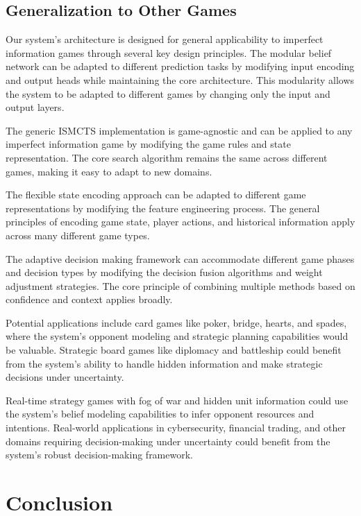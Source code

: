 \documentclass[conference]{IEEEtran}
\begin{document}
\subsection{Generalization to Other Games}

Our system's architecture is designed for general applicability to imperfect information games through several key design principles. The modular belief network can be adapted to different prediction tasks by modifying input encoding and output heads while maintaining the core architecture. This modularity allows the system to be adapted to different games by changing only the input and output layers.

The generic ISMCTS implementation is game-agnostic and can be applied to any imperfect information game by modifying the game rules and state representation. The core search algorithm remains the same across different games, making it easy to adapt to new domains.

The flexible state encoding approach can be adapted to different game representations by modifying the feature engineering process. The general principles of encoding game state, player actions, and historical information apply across many different game types.

The adaptive decision making framework can accommodate different game phases and decision types by modifying the decision fusion algorithms and weight adjustment strategies. The core principle of combining multiple methods based on confidence and context applies broadly.

Potential applications include card games like poker, bridge, hearts, and spades, where the system's opponent modeling and strategic planning capabilities would be valuable. Strategic board games like diplomacy and battleship could benefit from the system's ability to handle hidden information and make strategic decisions under uncertainty.

Real-time strategy games with fog of war and hidden unit information could use the system's belief modeling capabilities to infer opponent resources and intentions. Real-world applications in cybersecurity, financial trading, and other domains requiring decision-making under uncertainty could benefit from the system's robust decision-making framework.

\section{Conclusion}
\end{document}
